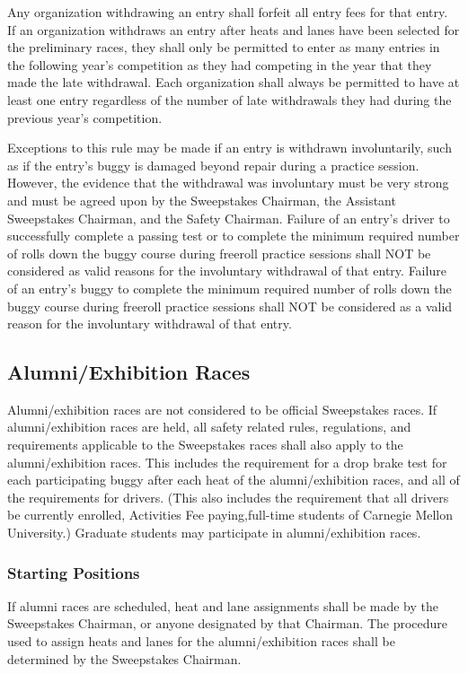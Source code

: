 \documentclass[openany]{book}
\begin{document}
Any organization withdrawing an entry shall forfeit all entry fees for that entry. If an organization withdraws an entry after heats and lanes have been selected for the preliminary races, they shall only be permitted to enter as many entries in the following year's competition as they had competing in the year that they made the late withdrawal. Each organization shall always be permitted to have at least one entry regardless of the number of late withdrawals they had during the previous year's competition.

Exceptions to this rule may be made if an entry is withdrawn involuntarily, such as if the entry's buggy is damaged beyond repair during a practice session. However, the evidence that the withdrawal was involuntary must be very strong and must be agreed upon by the Sweepstakes Chairman, the Assistant Sweepstakes Chairman, and the Safety Chairman. Failure of an entry's driver to successfully complete a passing test or to complete the minimum required number of rolls down the buggy course during freeroll practice sessions shall NOT be considered as valid reasons for the involuntary withdrawal of that entry. Failure of an entry's buggy to complete the minimum required number of rolls down the buggy course during freeroll practice sessions shall NOT be considered as a valid reason for the involuntary withdrawal of that entry.

\subsection{Alumni/Exhibition Races}

Alumni/exhibition races are not considered to be official Sweepstakes races. If alumni/exhibition races are held, all safety related rules, regulations, and requirements applicable to the Sweepstakes races shall also apply to the alumni/exhibition races. This includes the requirement for a drop brake test for each participating buggy after each heat of the alumni/exhibition races, and all of the requirements for drivers. (This also includes the requirement that all drivers be currently enrolled, Activities Fee paying,full-time students of Carnegie Mellon University.) Graduate students may participate in alumni/exhibition races.

\subsubsection{Starting Positions}

If alumni races are scheduled, heat and lane assignments shall be made by the Sweepstakes Chairman, or anyone designated by that Chairman. The procedure used to assign heats and lanes for the alumni/exhibition races shall be determined by the Sweepstakes Chairman.
\end{document}
